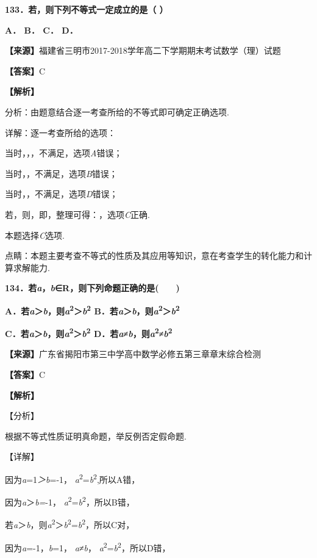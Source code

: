 \textbf{133．若，则下列不等式一定成立的是（ ）}

\textbf{A． B． C． D．}

\textbf{【来源】}福建省三明市2017-2018学年高二下学期期末考试数学（理）试题

\textbf{【答案】}C

\textbf{【解析】}

分析：由题意结合逐一考查所给的不等式即可确定正确选项.

详解：逐一考查所给的选项：

当时，，，不满足，选项\emph{A}错误；

当时，，不满足，选项\emph{B}错误；

当时，，不满足，选项\emph{D}错误；

若，则，即，整理可得：，选项\emph{C}正确.

本题选择\emph{C}选项.

点睛：本题主要考查不等式的性质及其应用等知识，意在考查学生的转化能力和计算求解能力.

\textbf{134．若\emph{a}，\emph{b}∈R，则下列命题正确的是(　　)}

\textbf{A．若\emph{a}＞\emph{b}，则\emph{a}\textsuperscript{2}＞\emph{b}\textsuperscript{2}
B．若\textbar{}\emph{a}\textbar＞\emph{b}，则\emph{a}\textsuperscript{2}＞\emph{b}\textsuperscript{2}}

\textbf{C．若\emph{a}＞\textbar{}\emph{b}\textbar，则\emph{a}\textsuperscript{2}＞\emph{b}\textsuperscript{2}
D．若\emph{a}≠\textbar{}\emph{b}\textbar，则\emph{a}\textsuperscript{2}≠\emph{b}\textsuperscript{2}}

\textbf{【来源】}广东省揭阳市第三中学高中数学必修五第三章章末综合检测

\textbf{【答案】}C

\textbf{【解析】}

【分析】

根据不等式性质证明真命题，举反例否定假命题.

【详解】

因为\emph{a}=1\emph{＞b}=-1，
\emph{a}\textsuperscript{2}=\emph{b}\textsuperscript{2},所以A错，

因为\textbar{}\emph{a}＞\emph{b=}-1，
\emph{a}\textsuperscript{2}=\emph{b}\textsuperscript{2}，所以B错，

若\emph{a}＞\textbar{}\emph{b}\textbar，则\emph{a}\textsuperscript{2}＞\textbar{}\emph{b}\textbar{}\textsuperscript{2}=\emph{b}\textsuperscript{2}，所以C对，

因为\emph{a}=-1，\emph{b}=1， \emph{a}≠\textbar{}\emph{b}\textbar，
\emph{a}\textsuperscript{2}=\emph{b}\textsuperscript{2}，所以D错，

